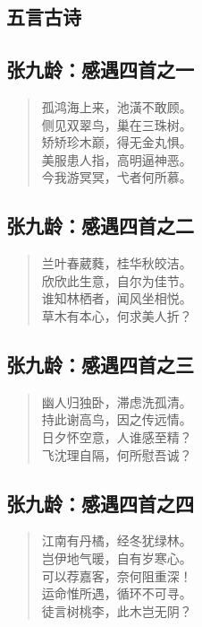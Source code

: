 \documentclass[12pt,oneside]{book}
\newenvironment{shici}{%
\begin{verse}\centering\yanti\large\hspace{12pt}}{\end{verse}}
\begin{document}
\begin{common-format}
\mainmatter

\part{五言古诗}
\chapter{张九龄：感遇四首之一}
\begin{shici}
孤鸿海上来，池潢不敢顾。\\
侧见双翠鸟，巢在三珠树。\\
矫矫珍木巅，得无金丸惧。\\
美服患人指，高明逼神恶。\\
今我游冥冥，弋者何所慕。
\end{shici}

\chapter{张九龄：感遇四首之二}
\begin{shici}
兰叶春葳蕤，桂华秋皎洁。\\
欣欣此生意，自尔为佳节。\\
谁知林栖者，闻风坐相悦。\\
草木有本心，何求美人折？
\end{shici}
  


\chapter{张九龄：感遇四首之三}
\begin{shici}
幽人归独卧，滞虑洗孤清。\\
持此谢高鸟，因之传远情。\\
日夕怀空意，人谁感至精？\\
飞沈理自隔，何所慰吾诚？
\end{shici}

\chapter{张九龄：感遇四首之四}
\begin{shici}
江南有丹橘，经冬犹绿林。\\
岂伊地气暖，自有岁寒心。\\
可以荐嘉客，奈何阻重深！\\
运命惟所遇，循环不可寻。\\
徒言树桃李，此木岂无阴？
\end{shici}


\end{common-format}
\end{document}
